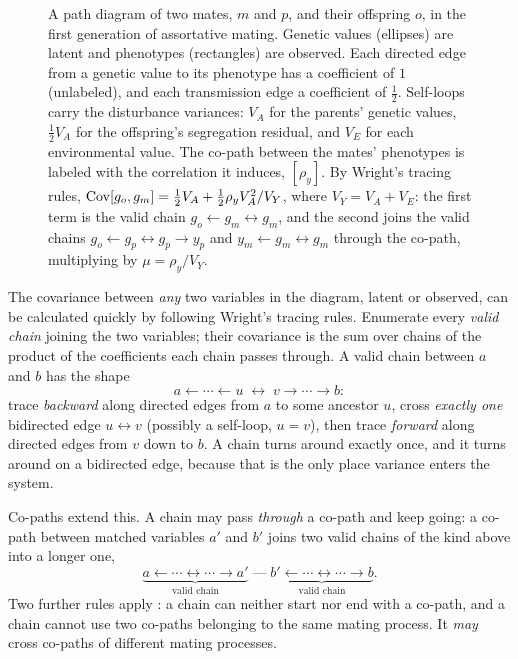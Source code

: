 \documentclass[12pt]{article}
\numberwithin{equation}{section}
\begin{document}
\begin{figure}[H]
    \begin{floatcard}
        
        \caption{%
            A path diagram of two mates, $m$ and $p$, and their offspring $o$, in the first generation of assortative mating.
            Genetic values (ellipses) are latent and phenotypes (rectangles) are observed.
            Each directed edge from a genetic value to its phenotype has a coefficient of $1$ (unlabeled), and each transmission edge a coefficient of $\tfrac12$.
            Self-loops carry the disturbance variances: $V_A$ for the parents' genetic values, $\tfrac12 V_A$ for the offspring's segregation residual, and $V_E$ for each environmental value.
            The co-path between the mates' phenotypes is labeled with the correlation it induces, $[\rho_y]$.
            By Wright's tracing rules, $\mathrm{Cov}[g_o, g_m] = \tfrac12 V_A + \tfrac12 \rho_y V_A^2 / V_Y$, where $V_Y = V_A + V_E$: the first term is the valid chain $g_o \leftarrow g_m \leftrightarrow g_m$, and the second joins the valid chains $g_o \leftarrow g_p \leftrightarrow g_p \rightarrow y_p$ and $y_m \leftarrow g_m \leftrightarrow g_m$ through the co-path, multiplying by $\mu = \rho_y / V_Y$.%
        }
        \label{fig:path-diagram-example}
    \end{floatcard}
\end{figure}

The covariance between \emph{any} two variables in the diagram, latent or observed, can be calculated quickly by following Wright's tracing rules.
Enumerate every \emph{valid chain} joining the two variables; their covariance is the sum over chains of the product of the coefficients each chain passes through.
A valid chain between $a$ and $b$ has the shape
$$
    a \leftarrow \cdots \leftarrow u \;\leftrightarrow\; v \rightarrow \cdots \rightarrow b :
$$
trace \emph{backward} along directed edges from $a$ to some ancestor $u$, cross \emph{exactly one} bidirected edge $u \leftrightarrow v$ (possibly a self-loop, $u=v$), then trace \emph{forward} along directed edges from $v$ down to $b$.
A chain turns around exactly once, and it turns around on a bidirected edge, because that is the only place variance enters the system.

Co-paths extend this.
A chain may pass \emph{through} a co-path and keep going: a co-path between matched variables $a'$ and $b'$ joins two valid chains of the kind above into a longer one,
$$
    \underbrace{a \leftarrow \cdots \leftrightarrow \cdots \rightarrow a'}_{\text{valid chain}}
    \;\text{---}\;
    \underbrace{b' \leftarrow \cdots \leftrightarrow \cdots \rightarrow b}_{\text{valid chain}} .
$$
Two further rules apply \citep{Sunde2025NatComm}: a chain can neither start nor end with a co-path, and a chain cannot use two co-paths belonging to the same mating process.
It \emph{may} cross co-paths of different mating processes.
\end{document}
